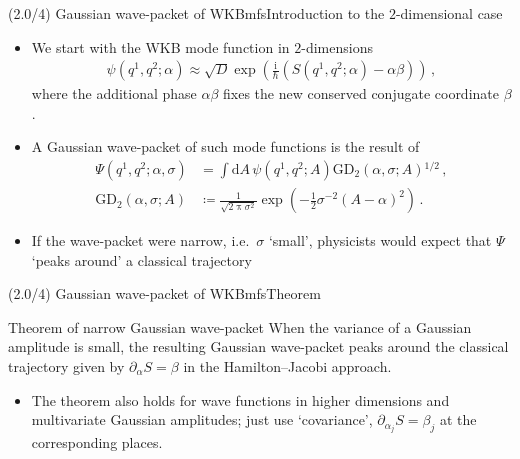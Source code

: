 \documentclass[mathserif]{beamer}
\newcommand{\rbr}[1]{{\left(#1\right)}}
\newcommand{\rfun}[2]{#1\mathopen{}\left(#2\right)\mathclose{}}
\newcommand{\dif}{\mathrm{d}}
\newcommand\mi{\mathrm{i}} %
\newcommand{\Alpha}{A}
\begin{document}
\begin{frame}{(2.0/4) Gaussian wave-packet of WKBmfs}{Introduction to the $2$-dimensional case}
\begin{itemize}
    \item We start with the WKB mode function in $2$-dimensions
\begin{align}
    \rfun{\psi}{q^1, q^2; \alpha} \approx \sqrt{D} \rfun{\exp}{\tfrac{\mi}{\hslash} \rbr{\rfun{S}{q^1, q^2; \alpha} - \alpha \beta}}\,,
\end{align}
where the additional phase $\alpha\beta$ fixes the new conserved conjugate coordinate $\beta$.

\item
A Gaussian wave-packet of such mode functions is the result of
\begin{subequations}
\begin{align}
    \rfun{\varPsi}{q^1, q^2; \alpha, \sigma} &=
    \int \dif \Alpha\,
    \rfun{\psi}{q^1, q^2; \Alpha}
    \rfun{\mathrm{GD}_2}{\alpha, \sigma; \Alpha}^{1/2}\,,
    \label{eq:packet-gaussian-50a} \\
    \rfun{\mathrm{GD}_2}{\alpha, \sigma; \Alpha} &\coloneqq
    \frac{1}{\sqrt{2\uppi \sigma^2}} \rfun{\exp}{-\frac{1}{2} \sigma^{-2} \rbr{\Alpha-\alpha}^2}\,.
    \label{eq:packet-gaussian-50b}
\end{align}
\end{subequations}
\item
If the wave-packet were \alert{narrow}, i.e.\ $\sigma$ `small', physicists would expect that $\varPsi$ `peaks around' a classical trajectory
\end{itemize}
\end{frame}

\begin{frame}{(2.0/4) Gaussian wave-packet of WKBmfs}{Theorem}
    \begin{alertblock}{Theorem of narrow Gaussian wave-packet}
    When the variance of a Gaussian amplitude is small, the resulting Gaussian wave-packet peaks around the classical trajectory given by $\partial_{\alpha} S = \beta$ in the Hamilton--Jacobi approach.
    \end{alertblock}
    \begin{itemize}
        \item The theorem also holds for wave functions in higher dimensions and multivariate Gaussian amplitudes; just use `covariance', $\partial_{\alpha_j} S = \beta_j$ at the corresponding places.
    \end{itemize}
\end{frame}
\end{document}
